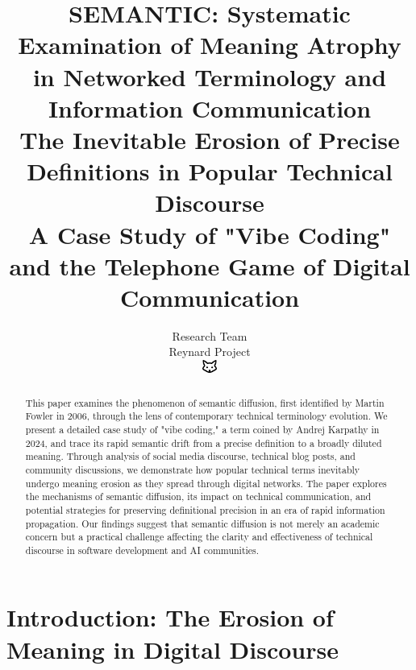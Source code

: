 \documentclass[11pt]{article}
\begin{document}
\title{\textbf{SEMANTIC: Systematic Examination of Meaning Atrophy in Networked Terminology and Information Communication} \\
\Large{The Inevitable Erosion of Precise Definitions in Popular Technical Discourse} \\
\large{A Case Study of "Vibe Coding" and the Telephone Game of Digital Communication}}

\author{Research Team\\
Reynard Project\\
\includegraphics[width=0.5cm]{../../shared-assets/favicon.pdf}}

\maketitle

\begin{abstract}
This paper examines the phenomenon of semantic diffusion, first identified by Martin Fowler in 2006, through the lens of contemporary technical terminology evolution. We present a detailed case study of "vibe coding," a term coined by Andrej Karpathy in 2024, and trace its rapid semantic drift from a precise definition to a broadly diluted meaning. Through analysis of social media discourse, technical blog posts, and community discussions, we demonstrate how popular technical terms inevitably undergo meaning erosion as they spread through digital networks. The paper explores the mechanisms of semantic diffusion, its impact on technical communication, and potential strategies for preserving definitional precision in an era of rapid information propagation. Our findings suggest that semantic diffusion is not merely an academic concern but a practical challenge affecting the clarity and effectiveness of technical discourse in software development and AI communities.
\end{abstract}

\tableofcontents
\newpage

\section{Introduction: The Erosion of Meaning in Digital Discourse}
\end{document}

